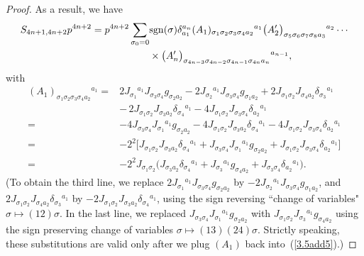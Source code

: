 \documentclass[pdftex]{sigma}
\numberwithin{equation}{section}
\theoremstyle{definition}
\newcommand{\sgn}{{\rm sgn}}
\begin{document}
\begin{proof}
As a result, we have
\begin{align}
S_{4n+1,4n+2}p^{4n+2}
 = p^{4n+2} \sum_{\sigma_0 = 0}& \sgn(\sigma) \delta_{a_1}^{a_n}
 ({A_1})_{\sigma_1 \sigma_2 \sigma_3 \sigma_4 a_2}{}^{a_1}
 \bigl({A_2^\prime}\bigr)_{\sigma_5 \sigma_6 \sigma_7 \sigma_8 a_3}{}^{a_2}\cdots\nonumber \\
&\times
\bigl({A_n^\prime}\bigr)_{\sigma_{4n-3} \sigma_{4n-2} \sigma_{4n-1} \sigma_{4n} a_n}{}^{a_{n-1}},\label{3.5add5}
\end{align}
with
\begin{align*}
({A_1})_{\sigma_1 \sigma_2 \sigma_3 \sigma_4 a_2}{}^{a_1}
={}&2J_{\sigma_1}{}^{a_1} J_{\sigma_3 \sigma_4} g_{\sigma_2 a_2}
-2 J_{\sigma_2}{}^{a_1} J_{\sigma_3 \sigma_4} g_{\sigma_1 a_2}
+2J_{\sigma_1 \sigma_2} J_{\sigma_4 a_2} \delta_{\sigma_3}{}^{a_1}
\\ \nonumber
&
{-}\,2J_{\sigma_1 \sigma_2} J_{\sigma_3 a_2} \delta_{\sigma_4}{}^{a_1}
-4J_{\sigma_1 \sigma_2} J_{\sigma_3 \sigma_4} \delta_{a_2}{}^{a_1}
\\ \nonumber
={}&{-}4 J_{\sigma_3 \sigma_4} J_{\sigma_1}{}^{a_1} g_{\sigma_2 a_2}
 -4 J_{\sigma_1 \sigma_2} J_{\sigma_3 a_2} \delta_{\sigma_4}{}^{a_1}
 -4J_{\sigma_1 \sigma_2} J_{\sigma_3 \sigma_4} \delta_{a_2}{}^{a_1}
\\ \nonumber
={}& {-}2^2 \bigl[J_{\sigma_1 \sigma_2} J_{\sigma_3 a_2} \delta_{\sigma_4}{}^{a_1}
 + J_{\sigma_3 \sigma_4} J_{\sigma_1}{}^{a_1} g_{\sigma_2 a_2}
 + J_{\sigma_1 \sigma_2} J_{\sigma_3 \sigma_4} \delta_{a_2}{}^{a_1}\bigr]
\\ \nonumber
={}&{-}2^2 J_{\sigma_1 \sigma_2}
 \bigl(J_{\sigma_3 a_2} \delta_{\sigma_4}{}^{a_1}
 +J_{\sigma_3}{}^{a_1} g_{\sigma_4 a_2}
 + J_{\sigma_3 \sigma_4} \delta_{a_2}{}^{a_1} \bigr).
\end{align*}
(To obtain the third line, we replace
$2J_{\sigma_1}{}^{a_1} J_{\sigma_3 \sigma_4} g_{\sigma_2 a_2} $ by
$-2 J_{\sigma_2}{}^{a_1} J_{\sigma_3 \sigma_4} g_{\sigma_1 a_2} $, and
$2J_{\sigma_1 \sigma_2} J_{\sigma_4 a_2} \delta_{\sigma_3}{}^{a_1} $
by $-2J_{\sigma_1 \sigma_2} J_{\sigma_3 a_2} \delta_{\sigma_4}{}^{a_1}$, using the sign reversing ``change of variables" $\sigma\mapsto (12)\sigma$.
In the last line, we replaced $ J_{\sigma_3 \sigma_4} J_{\sigma_1}{}^{a_1} g_{\sigma_2 a_2}$ with
$J_{\sigma_1 \sigma_2} J_{\sigma_3}{}^{a_1} g_{\sigma_4 a_2} $ using the sign preserving change of variables
$\sigma\mapsto (13)(24)\sigma$. Strictly speaking, these substitutions are valid only after we plug $(A_1)$ back into~(\ref{3.5add5}).)


\end{proof}
\end{document}
